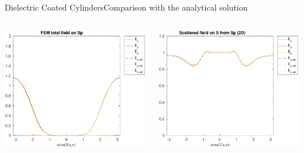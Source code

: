 \begin{frame}[allowframebreaks]{Dielectric Coated Cylinders}{Comparison with the analytical solution }
    \begin{columns}
      \includegraphics[width=\linewidth]{results/TM/E_Sp.pdf}

      \includegraphics[width=\linewidth]{results/TM/E_S.pdf}
      

\end{columns}
\end{frame}
